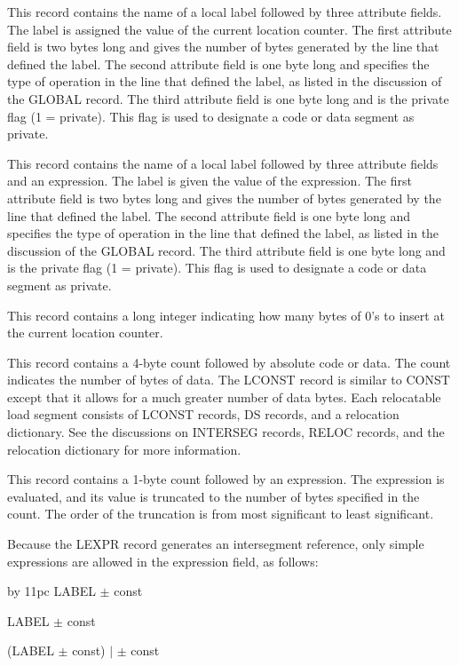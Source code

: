  This record contains the name of a local label followed by
three attribute fields. The label is assigned the value of the current
location counter. The first attribute field is two bytes long and gives the
number of bytes generated by the line that defined the label. The second
attribute field is one byte long and specifies the type of operation in the
line that defined the label, as listed in the discussion of the {\omf GLOBAL}
record. The third attribute field is one byte long and is the private flag
(1 = private). This flag is used to designate a code or data segment as private.

 This record contains the name of a local label followed by
three attribute fields and an expression. The label is given the value of the
expression. The first attribute field is two bytes long and gives the number
of bytes generated by the line that defined the label. The second attribute
field is one byte long and specifies the type of operation in the line that
defined the label, as listed in the discussion of the {\omf GLOBAL} record.
The third attribute field is one byte long and is the private flag (1 =
private). This flag is used to designate a code or data segment as private.

 This record contains a long integer indicating how many bytes
of 0's to insert at the current location counter.

 This record contains a 4-byte count followed by absolute
code or data. The count indicates the number of bytes of data. The
{\omf LCONST} record is similar to {\omf CONST} except that it allows for a
much greater number of data bytes. Each relocatable load segment consists of
{\omf LCONST} records, {\omf DS} records, and a relocation dictionary. See
the discussions on {\omf INTERSEG} records, {\omf RELOC} records, and the
relocation dictionary for more information.

 This record contains a 1-byte count followed by an
expression. The expression is evaluated, and its value is truncated to the
number of bytes specified in the count. The order of the truncation is from
most significant to least significant.

\bodybody
Because the {\omf LEXPR} record generates an intersegment reference, only
simple expressions are allowed in the expression field, as follows:

\medskip

\begingroup
\parskip=0pt\baselineskip=10pt
\advance\parindent by 11pc\text
LABEL $\pm$ const\par
LABEL $\pm$ const\par
(LABEL $\pm$ const) $\vert$ $\pm$ const\par
\endgroup

